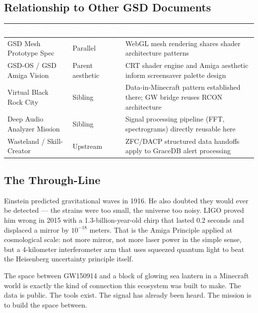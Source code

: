 \documentclass[11pt,letterpaper]{article}
\newcommand{\stageheader}[2]{%
  \noindent\colorbox{#2}{\makebox[\textwidth][l]{%
    \textcolor{white}{\bfseries\sffamily\hspace{6pt}#1\hspace{6pt}}}}%
  \vspace{0.5em}\par%
}
\newcommand{\tableheader}[1]{\textbf{\sffamily\textcolor{white}{#1}}}
\begin{document}
\subsection{Relationship to Other GSD Documents}

\begin{center}
\begin{tabularx}{\textwidth}{L{3.5cm}L{3cm}X}
\toprule
{}
\tableheader{Document} & \tableheader{Relationship} & \tableheader{Notes} \\
\midrule
GSD Mesh Prototype Spec & Parallel & WebGL mesh rendering shares shader architecture patterns \\
GSD-OS / GSD Amiga Vision & Parent aesthetic & CRT shader engine and Amiga aesthetic inform screensaver palette design \\
Virtual Black Rock City & Sibling & Data-in-Minecraft pattern established there; GW bridge reuses RCON architecture \\
Deep Audio Analyzer Mission & Sibling & Signal processing pipeline (FFT, spectrograms) directly reusable here \\
Wasteland / Skill-Creator & Upstream & ZFC/DACP structured data handoffs apply to GraceDB alert processing \\
\bottomrule
\end{tabularx}
\end{center}

\subsection{The Through-Line}

Einstein predicted gravitational waves in 1916. He also doubted they would ever be detected --- the strains were too small, the universe too noisy. LIGO proved him wrong in 2015 with a 1.3-billion-year-old chirp that lasted 0.2 seconds and displaced a mirror by $10^{-18}$ meters. That is the Amiga Principle applied at cosmological scale: not more mirror, not more laser power in the simple sense, but a 4-kilometer interferometer arm that uses squeezed quantum light to beat the Heisenberg uncertainty principle itself.

The space between GW150914 and a block of glowing sea lantern in a Minecraft world is exactly the kind of connection this ecosystem was built to make. The data is public. The tools exist. The signal has already been heard. The mission is to build the space between.

\newpage
\stageheader{STAGE 2 --- RESEARCH REFERENCE}{secondary}
\end{document}
